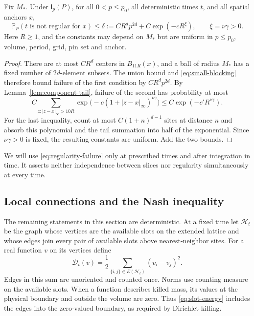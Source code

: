 \begin{proposition}\label{prop:regularity}
Fix \(M_*\).  Under \(\mathsf I_p(P)\), for all \(0<p\le p_0\),
all deterministic times \(t\), and all spatial anchors \(x\),
\begin{equation}\label{eq:regularity-failure}
 \mathbb P_P(t\text{ is not regular for }x)
 \le \delta:=C R^d p^{2d}+C\exp(-cR^\xi),
 \qquad \xi=\nu\gamma>0.
\end{equation}
Here \(R\ge1\), and the constants may depend on \(M_*\) but are
uniform in \(p\le p_0\), volume, period, grid, pin set and anchor.
\end{proposition}

\begin{proof}
There are at most \(C R^d\) centers in \(B_{11R}(x)\), and a ball
of radius \(M_*\) has a fixed number of \(2d\)-element subsets.
The union bound and \eqref{eq:small-blocking} therefore bound failure
of the first condition by \(C R^d p^{2d}\).
By Lemma~\ref{lem:component-tail}, failure of the second has probability
at most
\[
 C\sum_{z:|z-x|_\infty>10R}
   \exp\bigl(-c(1+|z-x|_\infty)^{\nu\gamma}\bigr)
 \le C\exp(-c'R^{\nu\gamma}).
\]
For the last inequality, count at most \(C(1+n)^{d-1}\) sites at
distance \(n\) and absorb this polynomial and the tail summation
into half of the exponential.  Since \(\nu\gamma>0\) is fixed,
the resulting constants are uniform.  Add the two bounds.
\end{proof}

We will use \eqref{eq:regularity-failure} only at prescribed times and
after integration in time.  It asserts neither independence between
slices nor regularity simultaneously at every time.

\subsection{Local connections and the Nash inequality}

The remaining statements in this section are deterministic.  At a
fixed time let \(\mathcal H_t\) be the graph whose vertices are the
available slots on the extended lattice and whose edges join every
pair of available slots above nearest-neighbor sites.  For a real
function \(v\) on its vertices define
\begin{equation}\label{eq:slot-energy}
 \mathcal D_t(v)=\frac12
 \sum_{\{i,j\}\in E(\mathcal H_t)}(v_i-v_j)^2.
\end{equation}
Edges in this sum are unoriented and counted once.  Norms use counting
measure on the available slots.  When a function describes killed
mass, its values at the physical boundary and outside the volume are
zero.  Thus \eqref{eq:slot-energy} includes the edges into the
zero-valued boundary, as required by Dirichlet killing.

